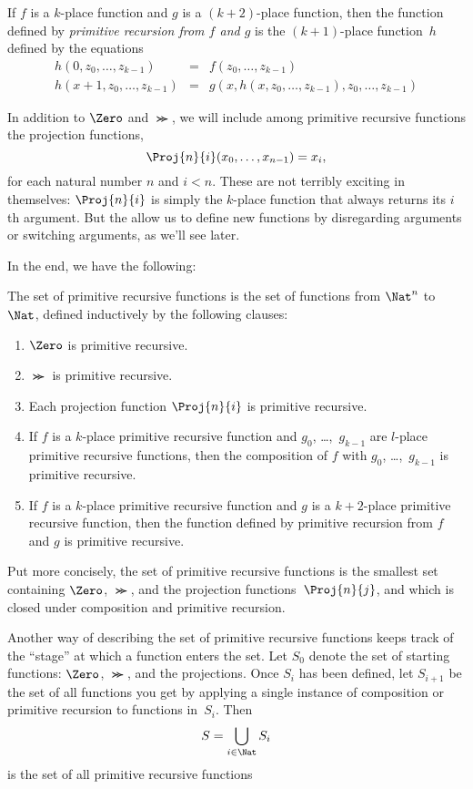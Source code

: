 \documentclass[../../../include/open-logic-section]{subfiles}
\begin{document}
\begin{defn}
If $f$ is a $k$-place function and
$g$ is a $(k+2)$-place function, then the function
defined by \emph{primitive recursion from $f$ and $g$} is the
$(k+1)$-place function~$h$ defined by the equations
\begin{eqnarray*}
h(0,z_0,\dots,z_{k-1}) & = & f(z_0,\dots,z_{k-1}) \\
h(x+1,z_0,\dots,z_{k-1}) & = & g(x,h(x,z_0,\dots,z_{k-1}),z_0,\dots,z_{k-1})
\end{eqnarray*}
\end{defn}

In addition to $\Zero$ and $\Succ$, we will include among primitive
recursive functions the projection functions,
\[
\Proj{n}{i}(x_0,\dots,x_{n-1}) = x_i,
\]
for each natural number $n$ and $i < n$. These are not terribly
exciting in themselves: $\Proj{n}{i}$ is simply the $k$-place function
that always returns its $i$th argument. But the allow us to define new
functions by disregarding arguments or switching arguments, as we'll
see later.

In the end, we have the following:

\begin{defn}
  The set of primitive recursive functions is the set of functions 
  from $\Nat^n$ to $\Nat$, defined inductively by the
  following clauses:
\begin{enumerate}
\item $\Zero$ is primitive recursive.
\item $\Succ$ is primitive recursive.
\item Each projection function $\Proj{n}{i}$ is primitive recursive.
\item If $f$ is a $k$-place primitive recursive function and
  $g_0$, \dots,~$g_{k-1}$ are $l$-place primitive recursive functions, then
  the composition of $f$ with $g_0$, \dots,~$g_{k-1}$ is primitive
  recursive.
\item If $f$ is a $k$-place primitive recursive function and $g$ is a
  $k+2$-place primitive recursive function, then the function defined by
  primitive recursion from $f$ and $g$ is primitive recursive.
\end{enumerate}
\end{defn}

\begin{explain}
Put more concisely, the set of primitive recursive functions is the
smallest set containing $\Zero$, $\Succ$, and the projection
functions~$\Proj{n}{j}$, and which is closed under composition and
primitive recursion.

Another way of describing the set of primitive recursive functions
keeps track of the ``stage'' at which a function enters the set. Let
$S_0$ denote the set of starting functions: $\Zero$, $\Succ$, and the
projections. Once $S_i$ has been defined, let $S_{i+1}$ be the set of
all functions you get by applying a single instance of composition or
primitive recursion to functions in~$S_i$. Then
\[
S = \bigcup_{i \in \Nat} S_i
\]
is the set of all primitive recursive functions
\end{explain}
\end{document}
